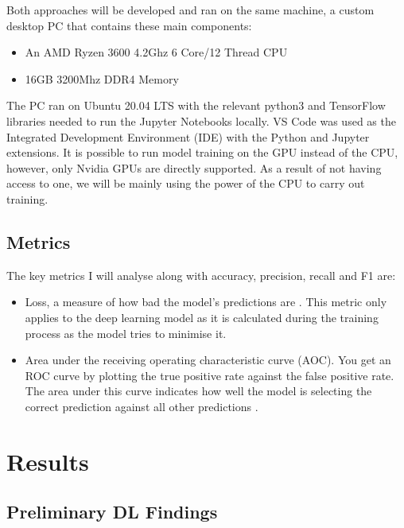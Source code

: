 \documentclass[12pt,a4paper]{report}
\begin{document}
\label{subsec:env}

Both approaches will be developed and ran on the same machine, a custom desktop PC that contains these main components: 

\begin{itemize}
    \item An AMD Ryzen 3600 4.2Ghz 6 Core/12 Thread CPU
    \item 16GB 3200Mhz DDR4 Memory
\end{itemize}

The PC ran on Ubuntu 20.04 LTS with the relevant python3 and TensorFlow libraries needed to run the Jupyter Notebooks 
locally. VS Code was used as the Integrated Development Environment (IDE) with the Python and Jupyter extensions.  It is
possible to run model training on the GPU instead of the CPU, however, only Nvidia GPUs are directly supported. As a 
result of not having access to one, we will be mainly using the power of the CPU to carry out training.

\subsection{Metrics}

The key metrics I will analyse along with accuracy, precision, recall and F1 are: 

\begin{itemize}
    \item Loss, a measure of how bad the model's predictions are \citep{googletrainloss}. 
    This metric only applies to the deep learning model as it is calculated during the training process as the model 
    tries to minimise it.
    \item Area under the receiving operating characteristic curve (AOC). You get an ROC curve by plotting the true 
    positive rate against the false positive rate. The area under this curve indicates how well the model is selecting 
    the correct prediction against all other predictions \citep{googleroc}.
\end{itemize}

\section{Results}

\subsection{Preliminary DL Findings}
\end{document}
